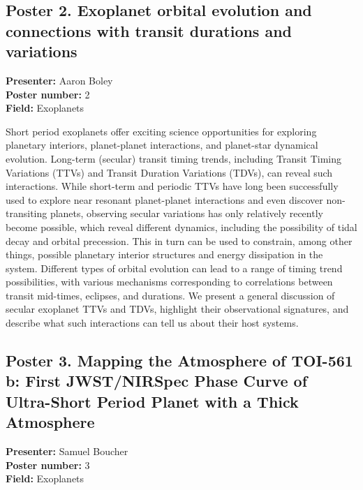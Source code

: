 \subsection*{Poster 2. Exoplanet orbital evolution and connections with transit durations and variations}
\textbf{Presenter:} Aaron Boley\\
\textbf{Poster number:} 2\\
\textbf{Field:} Exoplanets

Short period exoplanets offer exciting science opportunities for exploring planetary interiors, planet-planet interactions, and planet-star dynamical evolution. Long-term (secular) transit timing trends, including Transit Timing Variations (TTVs) and Transit Duration Variations (TDVs), can reveal such interactions. While short-term and periodic TTVs have long been successfully used to explore near resonant planet-planet interactions and even discover non-transiting planets, observing secular variations has only relatively recently become possible, which reveal different dynamics, including the possibility of tidal decay and orbital precession. This in turn can be used to constrain, among other things, possible planetary interior structures and energy dissipation in the system. Different types of orbital evolution can lead to a range of timing trend possibilities, with various mechanisms corresponding to correlations between transit mid-times, eclipses, and durations. We present a general discussion of secular exoplanet TTVs and TDVs, highlight their observational signatures, and describe what such interactions can tell us about their host systems.

\hypertarget{poster-abstract-talk-237}{}\label{poster-abstract-page-talk-237}
\subsection*{Poster 3. Mapping the Atmosphere of TOI-561 b: First JWST/NIRSpec Phase Curve of Ultra-Short Period Planet with a Thick Atmosphere}
\textbf{Presenter:} Samuel Boucher\\
\textbf{Poster number:} 3\\
\textbf{Field:} Exoplanets

